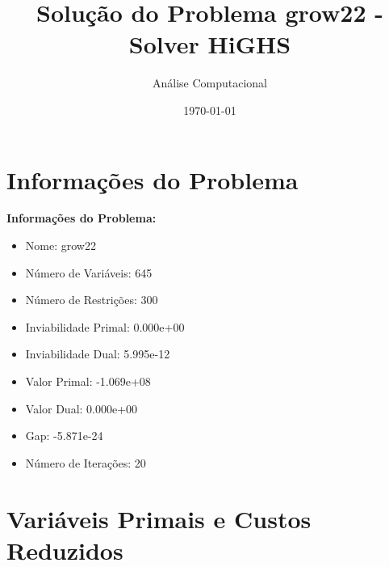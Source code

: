 \documentclass[12pt]{article}
\title{Solução do Problema grow22 - Solver HiGHS}
\author{Análise Computacional}
\date{\today}
\begin{document}
\maketitle

\section{Informações do Problema}

\textbf{Informações do Problema:}
\begin{itemize}
\item Nome: grow22
\item Número de Variáveis: 645
\item Número de Restrições: 300
\item Inviabilidade Primal: 0.000e+00
\item Inviabilidade Dual: 5.995e-12
\item Valor Primal: -1.069e+08
\item Valor Dual: 0.000e+00
\item Gap: -5.871e-24
\item Número de Iterações: 20
\end{itemize}


\section{Variáveis Primais e Custos Reduzidos}
\end{document}
